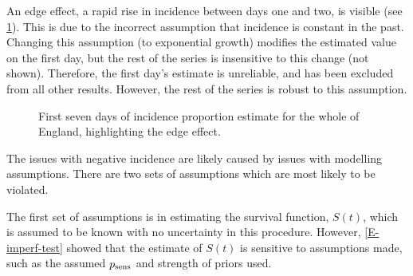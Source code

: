 \documentclass[thesis.tex]{subfiles}
\begin{document}
An edge effect, a rapid rise in incidence between days one and two, is visible (see \cref{transmission:fig:backcalc-start-effect}).
This is due to the incorrect assumption that incidence is constant in the past.
Changing this assumption (\eg to exponential growth) modifies the estimated value on the first day, but the rest of the series is insensitive to this change (not shown).
Therefore, the first day's estimate is unreliable, and has been excluded from all other results.
However, the rest of the series is robust to this assumption.
\begin{figure}
    \caption[Edge effects in the phenomenological approach]{%
        First seven days of incidence proportion estimate for the whole of England, highlighting the edge effect.
    }
    \label{transmission:fig:backcalc-start-effect}
\end{figure}

The issues with negative incidence are likely caused by issues with modelling assumptions.
There are two sets of assumptions which are most likely to be violated.

The first set of assumptions is in estimating the survival function, $S(t)$, which is assumed to be known with no uncertainty in this procedure.
However, \cref{E-imperf-test} showed that the estimate of $S(t)$ is sensitive to assumptions made, such as the assumed $p_\text{sens}$ and strength of priors used.
\end{document}

